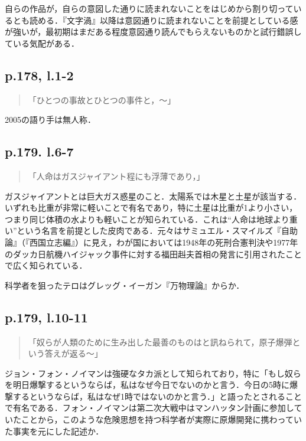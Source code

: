 \documentclass[10pt, a5paper, twoside]{ltjsarticle}
\begin{document}
            自らの作品が，自らの意図した通りに読まれないことをはじめから割り切っているとも読める．『文字渦』以降は意図通りに読まれないことを前提としている感が強いが，最初期はまだある程度意図通り読んでもらえないものかと試行錯誤している気配がある．

        \subsection{p.178, l.1-2}

            \begin{quote}
                「ひとつの事故とひとつの事件と，〜」
            \end{quote}

            2005の語り手は無人称．

        \subsection{p.179. l.6-7}

            \begin{quote}
                「人命はガスジャイアント程にも浮薄であり，」
            \end{quote}

            ガスジャイアントとは巨大ガス惑星のこと．太陽系では木星と土星が該当する．いずれも比重が非常に軽いことで有名であり，特に土星は比重が1より小さい，つまり同じ体積の水よりも軽いことが知られている．これは“人命は地球より重い”という名言を前提とした皮肉である．元々はサミュエル・スマイルズ『自助論』（『西国立志編』）\cite{smiles}に見え，わが国においては1948年の死刑合憲判決\cite{justice}や1977年のダッカ日航機ハイジャック事件に対する福田赳夫首相の発言に引用されたことで広く知られている．

            科学者を狙ったテロはグレッグ・イーガン『万物理論』からか．

        \subsection{p.179, l.10-11}

            \begin{quote}
                「奴らが人類のために生み出した最善のものはと訊ねられて，原子爆弾という答えが返る〜」
            \end{quote}

            ジョン・フォン・ノイマンは強硬なタカ派として知られており，特に「もし奴らを明日爆撃するというならば，私はなぜ今日でないのかと言う．今日の5時に爆撃するというならば，私はなぜ1時ではないのかと言う．」と語ったとされること\cite{life}で有名である．フォン・ノイマンは第二次大戦中はマンハッタン計画に参加していたことから，このような危険思想を持つ科学者が実際に原爆開発に携わっていた事実を元にした記述か．
\end{document}
